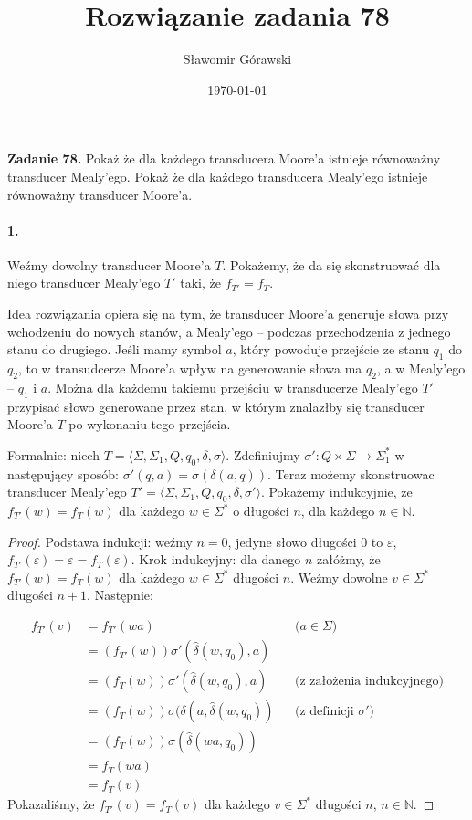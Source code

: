 \documentclass{article}
\title{Rozwiązanie zadania 78}
\author{Sławomir Górawski}
\date{\today}
\begin{document}
\maketitle

\noindent\textbf{Zadanie 78.}
Pokaż że dla każdego transducera Moore’a istnieje równoważny transducer Mealy’ego.
Pokaż że dla każdego transducera Mealy’ego istnieje \\
równoważny transducer Moore’a.

\paragraph{1.}
Weźmy dowolny transducer Moore'a $T$.
Pokażemy, że da się skonstruować dla niego transducer Mealy'ego $T'$
taki, że $f_{T'} = f_T$.

Idea rozwiązania opiera się na tym,
że transducer Moore'a generuje słowa przy wchodzeniu do nowych stanów,
a Mealy'ego -- podczas przechodzenia z jednego stanu do drugiego.
Jeśli mamy symbol $a$,
który powoduje przejście ze stanu $q_1$ do $q_2$,
to w transudcerze Moore'a wpływ na generowanie słowa ma $q_2$,
a w Mealy'ego -- $q_1$ i $a$.
Można dla każdemu takiemu przejściu w transducerze Mealy'ego $T'$
przypisać słowo generowane przez stan,
w którym znalazłby się transducer Moore'a $T$ po wykonaniu tego przejścia.

Formalnie: niech
$T = \langle \Sigma, \Sigma_1, Q, q_0, \delta, \sigma \rangle$.
Zdefiniujmy
$\sigma' : Q \times \Sigma \rightarrow \Sigma_1^*$
w następujący sposób:
$\sigma'(q, a) = \sigma(\delta(a, q))$.
Teraz możemy skonstruowac transducer Mealy'ego
$T' = \langle \Sigma, \Sigma_1, Q, q_0, \delta, \sigma' \rangle$.
Pokażemy indukcyjnie,
że $f_{T'}(w) = f_T(w)$ dla każdego $w \in \Sigma^*$ o długości $n$,
dla każdego $n \in \mathbb{N}$.

\begin{proof}
Podstawa indukcji: weźmy $n = 0$, jedyne słowo długości $0$ to $\varepsilon$,
$f_{T'}(\varepsilon) = \varepsilon = f_T(\varepsilon)$.
Krok indukcyjny: dla danego $n$ załóżmy,
że $f_{T'}(w) = f_T(w)$
dla każdego $w \in \Sigma^*$ długości $n$.
Weźmy dowolne $v \in \Sigma^*$ długości $n + 1$.
Następnie:

\begin{align*}
    f_{T'}(v) & = f_{T'}(wa)
    && \text{($a \in \Sigma$)} \\
    & = (f_{T'}(w))\sigma'(\hat{\delta}(w, q_0), a) \\
    & = (f_T(w))\sigma'(\hat{\delta}(w, q_0), a)
    && \text{(z założenia indukcyjnego)} \\
    & = (f_T(w))\sigma(\delta(a, \hat{\delta}(w, q_0))
    && \text{(z definicji $\sigma'$)} \\
    & = (f_T(w))\sigma(\hat{\delta}(wa, q_0)) \\
    & = f_T(wa) \\
    & = f_T(v)
\end{align*}
Pokazaliśmy, że $f_{T'}(v) = f_T(v)$
dla każdego $v \in \Sigma^*$ długości $n$, $n \in \mathbb{N}$.
\end{proof}
\end{document}

